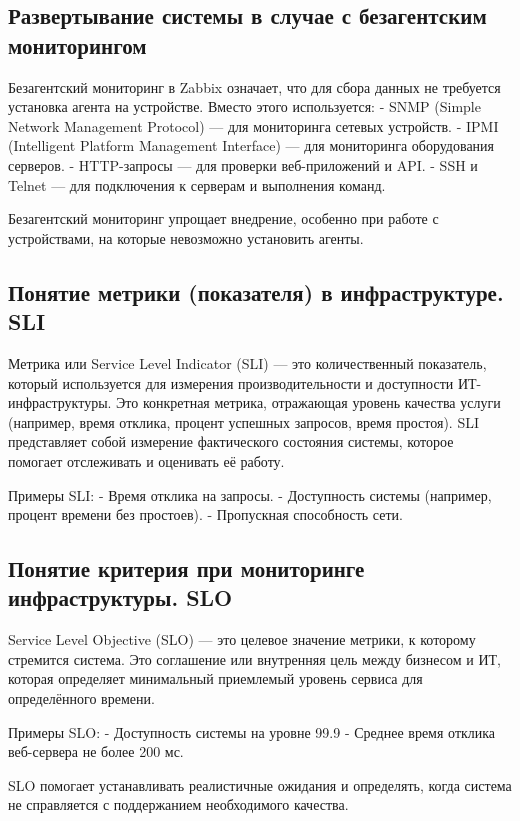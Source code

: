 \subsection{Развертывание системы в случае с безагентским мониторингом}
Безагентский мониторинг в Zabbix означает, что для сбора данных не требуется установка агента на устройстве. Вместо этого используется:
- SNMP (Simple Network Management Protocol) — для мониторинга сетевых устройств.
- IPMI (Intelligent Platform Management Interface) — для мониторинга оборудования серверов.
- HTTP-запросы — для проверки веб-приложений и API.
- SSH и Telnet — для подключения к серверам и выполнения команд.

Безагентский мониторинг упрощает внедрение, особенно при работе с устройствами, на которые невозможно установить агенты.

\subsection{Понятие метрики (показателя) в инфраструктуре. SLI}
Метрика или Service Level Indicator (SLI) — это количественный показатель, который используется для измерения производительности и доступности ИТ-инфраструктуры. Это конкретная метрика, отражающая уровень качества услуги (например, время отклика, процент успешных запросов, время простоя). SLI представляет собой измерение фактического состояния системы, которое помогает отслеживать и оценивать её работу.

Примеры SLI:
- Время отклика на запросы.
- Доступность системы (например, процент времени без простоев).
- Пропускная способность сети.

\subsection{Понятие критерия при мониторинге инфраструктуры. SLO}
Service Level Objective (SLO) — это целевое значение метрики, к которому стремится система. Это соглашение или внутренняя цель между бизнесом и ИТ, которая определяет минимальный приемлемый уровень сервиса для определённого времени.

Примеры SLO:
- Доступность системы на уровне 99.9%
- Среднее время отклика веб-сервера не более 200 мс.

SLO помогает устанавливать реалистичные ожидания и определять, когда система не справляется с поддержанием необходимого качества.
